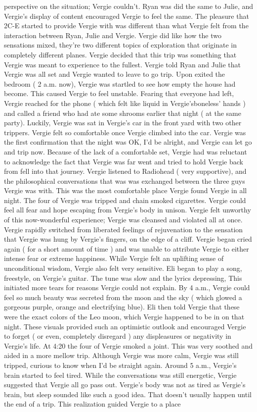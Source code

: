\documentclass[12pt]{book}
\begin{document}
perspective on the situation; Vergie couldn't. Ryan was did the same to Julie, and Vergie's display of content encouraged Vergie to feel the same. The pleasure that 2C-E started to provide Vergie with was different than what Vergie felt from the interaction between Ryan, Julie and Vergie. Vergie did like how the two sensations mixed, they're two different topics of exploration that originate in completely different planes. Vergie decided that this trip was something that Vergie was meant to experience to the fullest. Vergie told Ryan and Julie that Vergie was all set and Vergie wanted to leave to go trip. Upon exited the bedroom ( 2 a.m. now), Vergie was startled to see how empty the house had become. This caused Vergie to feel unstable. Fearing that everyone had left, Vergie reached for the phone ( which felt like liquid in Vergie'sboneless' hands ) and called a friend who had ate some shrooms earlier that night ( at the same party). Luckily, Vergie was sat in Vergie's car in the front yard with two other trippers. Vergie felt so comfortable once Vergie climbed into the car. Vergie was the first confirmation that the night was OK, I'd be alright, and Vergie can let go and trip now. Because of the lack of a comfortable set, Vergie had was reluctant to acknowledge the fact that Vergie was far went and tried to hold Vergie back from fell into that journey. Vergie listened to Radiohead ( very supportive), and the philosophical conversations that was was exchanged between the three guys Vergie was with. This was the most comfortable place Vergie found Vergie in all night. The four of Vergie was tripped and chain smoked cigarettes. Vergie could feel all fear and hope escaping from Vergie's body in unison. Vergie felt unworthy of this now-wonderful experience; Vergie was cleansed and violated all at once. Vergie rapidly switched from liberated feelings of rejuvenation to the sensation that Vergie was hung by Vergie's fingers, on the edge of a cliff. Vergie began cried again ( for a short amount of time ) and was unable to attribute Vergie to either intense fear or extreme happiness. While Vergie felt an uplifting sense of unconditional wisdom, Vergie also felt very sensitive. Eli began to play a song, freestyle, on Vergie's guitar. The tune was slow and the lyrics depressing, This initiated more tears for reasons Vergie could not explain. By 4 a.m., Vergie could feel so much beauty was secreted from the moon and the sky ( which glowed a gorgeous purple, orange and electrifying blue). Eli then told Vergie that these were the exact colors of the Leo moon, which Vergie happened to be in on that night. These visuals provided such an optimistic outlook and encouraged Vergie to forget ( or even, completely disregard ) any displeasures or negativity in Vergie's life. At 4:20 the four of Vergie smoked a joint. This was very soothed and aided in a more mellow trip. Although Vergie was more calm, Vergie was still tripped, curious to know when I'd be straight again. Around 5 a.m., Vergie's brain started to feel tired. While the conversations was still energetic, Vergie suggested that Vergie all go pass out. Vergie's body was not as tired as Vergie's brain, but sleep sounded like such a good idea. That doesn't usually happen until the end of a trip. This realization guided Vergie to a place 
\end{document}

